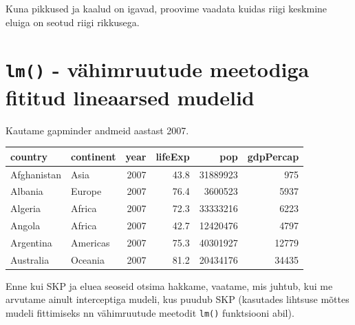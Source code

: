 \documentclass[]{book}
\newenvironment{Shaded}{\begin{snugshade}}{\end{snugshade}}
\newcommand{\CommentTok}[1]{\textcolor[rgb]{0.56,0.35,0.01}{\textit{#1}}}
\newcommand{\DecValTok}[1]{\textcolor[rgb]{0.00,0.00,0.81}{#1}}
\newcommand{\KeywordTok}[1]{\textcolor[rgb]{0.13,0.29,0.53}{\textbf{#1}}}
\newcommand{\NormalTok}[1]{#1}
\newcommand{\OperatorTok}[1]{\textcolor[rgb]{0.81,0.36,0.00}{\textbf{#1}}}
\newcommand{\StringTok}[1]{\textcolor[rgb]{0.31,0.60,0.02}{#1}}
\begin{document}
Kuna pikkused ja kaalud on igavad, proovime vaadata kuidas riigi keskmine eluiga on seotud riigi rikkusega.

\hypertarget{lm---vahimruutude-meetodiga-fititud-lineaarsed-mudelid}{%
\section*{\texorpdfstring{\texttt{lm()} - vähimruutude meetodiga fititud lineaarsed mudelid}{lm() - vähimruutude meetodiga fititud lineaarsed mudelid}}\label{lm---vahimruutude-meetodiga-fititud-lineaarsed-mudelid}}

Kautame gapminder andmeid aastast 2007.

\begin{Shaded}
\end{Shaded}

\begin{tabular}{l|l|r|r|r|r}
\hline
country & continent & year & lifeExp & pop & gdpPercap\\
\hline
Afghanistan & Asia & 2007 & 43.8 & 31889923 & 975\\
\hline
Albania & Europe & 2007 & 76.4 & 3600523 & 5937\\
\hline
Algeria & Africa & 2007 & 72.3 & 33333216 & 6223\\
\hline
Angola & Africa & 2007 & 42.7 & 12420476 & 4797\\
\hline
Argentina & Americas & 2007 & 75.3 & 40301927 & 12779\\
\hline
Australia & Oceania & 2007 & 81.2 & 20434176 & 34435\\
\hline
\end{tabular}

Enne kui SKP ja eluea seoseid otsima hakkame, vaatame, mis juhtub, kui me arvutame ainult interceptiga mudeli, kus puudub SKP (kasutades lihtsuse mõttes mudeli fittimiseks nn vähimruutude meetodit \texttt{lm()} funktsiooni abil).
\end{document}
